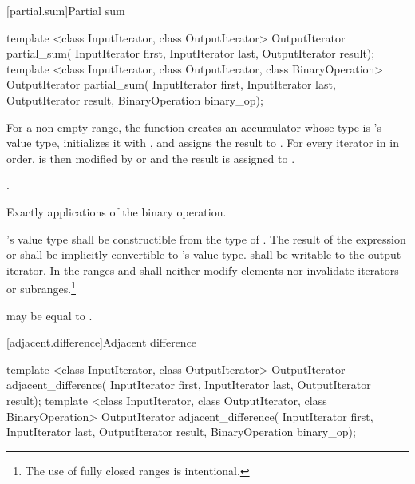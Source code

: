 [partial.sum]{Partial sum}

%
\begin{itemdecl}
template <class InputIterator, class OutputIterator>
  OutputIterator partial_sum(
    InputIterator first, InputIterator last,
    OutputIterator result);
template
  <class InputIterator, class OutputIterator, class BinaryOperation>
    OutputIterator partial_sum(
      InputIterator first, InputIterator last,
      OutputIterator result, BinaryOperation binary_op);
\end{itemdecl}

\begin{itemdescr}
\pnum
\effects For a non-empty range,
the function creates an accumulator  whose type is 's
value type, initializes it with ,
and assigns the result to . For every iterator  in 
in order,  is then modified by  or 
and the result is assigned to .

\pnum
\returns
{}.

\pnum
\complexity
Exactly
applications of
the binary operation.

\pnum
\requires
{}'s value type shall be constructible from the type of .
The result of the expression  or  shall be
implicitly convertible to 's value type. 
shall be writable to the  output iterator.
In the ranges
and
\mbox{}
shall neither modify elements nor invalidate iterators or subranges.\footnote{The use of fully closed ranges is intentional.
}

\pnum
\notes
{}
may be equal to
.
\end{itemdescr}

[adjacent.difference]{Adjacent difference}

%
\begin{itemdecl}
template <class InputIterator, class OutputIterator>
  OutputIterator adjacent_difference(
    InputIterator first, InputIterator last,
    OutputIterator result);
template <class InputIterator, class OutputIterator, class BinaryOperation>
  OutputIterator adjacent_difference(
    InputIterator first, InputIterator last,
    OutputIterator result,
    BinaryOperation binary_op);
\end{itemdecl}

